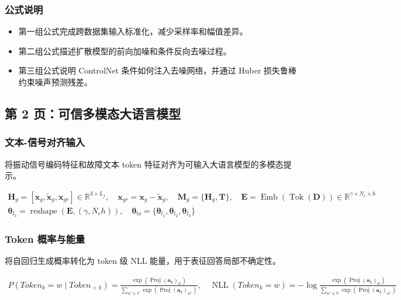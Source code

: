 ﻿\documentclass[UTF8,a4paper,10pt]{ctexart}
\begin{document}
\subsubsection*{公式说明}
\begin{itemize}
  \item 第一组公式完成跨数据集输入标准化，减少采样率和幅值差异。
  \item 第二组公式描述扩散模型的前向加噪和条件反向去噪过程。
  \item 第三组公式说明 ControlNet 条件如何注入去噪网络，并通过 Huber 损失鲁棒约束噪声预测残差。
\end{itemize}

\clearpage
\subsection{第 2 页：可信多模态大语言模型}

\subsubsection*{文本-信号对齐输入}
将振动信号编码特征和故障文本 token 特征对齐为可输入大语言模型的多模态提示。
\begin{formulabox}
\[\begin{gathered}
  \bm H_g
  = [\bm{x}_g,\tilde{\bm{x}}_g,\bm{x}_{gr}]\in\mathbb{R}^{3\times L_f}, \quad
  \bm{x}_{gr}
  = \bm{x}_g-\tilde{\bm{x}}_g, \quad
  \bm{M}_g
  = \{\bm H_g,\bm T\}, \quad
  \bm E
  = \operatorname{Emb}(\operatorname{Tok}(\bm D))
  \in \mathbb{R}^{\gamma\times N_c\times h} \\
  \bm\theta_{l_3}
  = \operatorname{reshape}(\bm E,(\gamma,N_ch)), \quad
  \bm\theta_{\mathrm{ts}}
  =\{\bm\theta_{l_1},\bm\theta_{l_2},\bm\theta_{l_3}\}
\end{gathered}\]
\end{formulabox}

\subsubsection*{Token 概率与能量}
将自回归生成概率转化为 token 级 NLL 能量，用于表征回答局部不确定性。
\begin{formulabox}
\[\begin{gathered}
  P(\mathit{Token}_k=w\mid \mathit{Token}_{<k})
  =
  \frac{\exp(\operatorname{Proj}(\bm a_k)_w)}
  {\sum_{w'\in\mathcal{V}}\exp(\operatorname{Proj}(\bm a_k)_{w'})}, \quad
  \operatorname{NLL}(\mathit{Token}_k=w)
  =
  -\log
  \frac{\exp(\operatorname{Proj}(\bm a_k)_w)}
  {\sum_{w'\in\mathcal{V}}\exp(\operatorname{Proj}(\bm a_k)_{w'})}
\end{gathered}\]
\end{formulabox}
\end{document}
